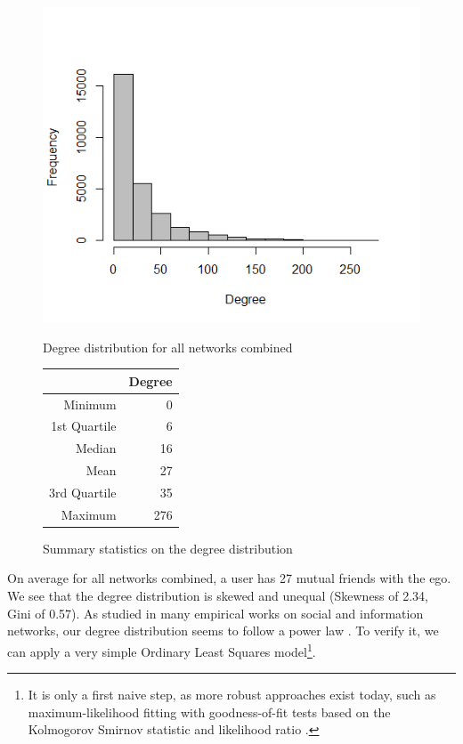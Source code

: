 \documentclass[11pt]{article}       %
\begin{document}
\begin{figure}[H]
\centering
\begin{minipage}[b]{0.55\linewidth}
\vspace{0pt}
\includegraphics[width=\linewidth]{degreedistribution.png}
\caption{Degree distribution for all networks combined}
\end{minipage}
\hspace{0.5cm}
\begin{minipage}[b]{0.35\linewidth}
\captionsetup{type=table}
\centering
\begin{tabular}[b]{rr}
  \hline
 & Degree \\ 
  \hline
Minimum & 0 \\ 
  1st Quartile & 6 \\ 
  Median & 16 \\ 
  Mean & 27 \\ 
  3rd Quartile & 35\\ 
  Maximum & 276 \\ 
   \hline
\end{tabular}
\vspace{1.8cm}
\caption{Summary statistics on the degree distribution}
\end{minipage}
\end{figure}

On average for all networks combined, a user has 27 mutual friends with the ego. We see that the degree distribution is skewed and unequal (Skewness of 2.34, Gini of 0.57). As studied in many empirical works on social and information networks, our degree distribution seems to follow a power law \cite{clauset2009power, girvan2002community,ugander2011anatomy}. To verify it, we can apply a very simple Ordinary Least Squares model\footnote{It is only a first naive step, as more robust approaches exist today, such as maximum-likelihood fitting with goodness-of-fit tests based on the Kolmogorov Smirnov statistic and likelihood ratio \cite{clauset2009power}.}.    
\end{document}
